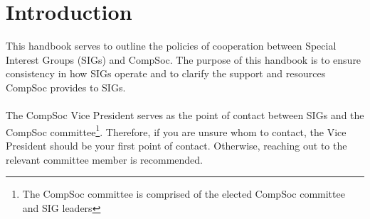 \section{Introduction}
This handbook serves to outline the policies of cooperation between Special Interest Groups (SIGs) and CompSoc. The purpose of this handbook is to ensure consistency in how SIGs operate and to clarify the support and resources CompSoc provides to SIGs.
\\ \\
The CompSoc Vice President serves as the point of contact between SIGs and the CompSoc committee\footnote{The CompSoc committee is comprised of the elected CompSoc committee and SIG leaders}. Therefore, if you are unsure
whom to contact, the Vice President should be your first point of contact. Otherwise, reaching
out to the relevant committee member is recommended.